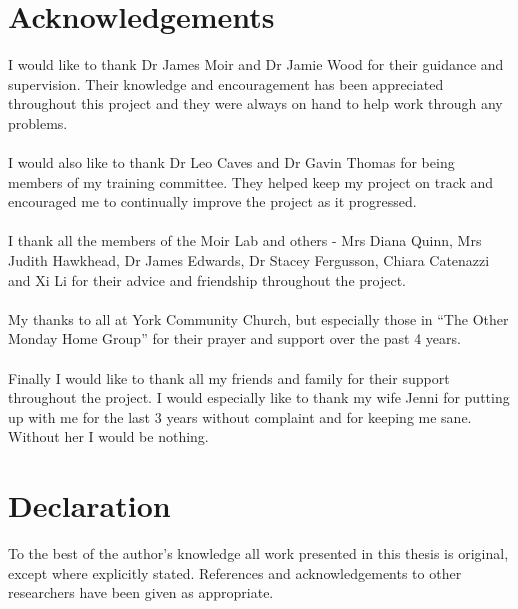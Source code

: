 \documentclass[a4paper,oneside,openright,12pt]{book}
\begin{document}
\chapter*{Acknowledgements}
I would like to thank Dr James Moir and Dr Jamie Wood for their guidance and supervision. Their knowledge and encouragement has been appreciated throughout this project and they were always on hand to help work through any problems.
\\\\
I would also like to thank Dr Leo Caves and Dr Gavin Thomas for being members of my training committee. They helped keep my project on track and encouraged me to continually improve the project as it progressed.
\\\\
I thank all the members of the Moir Lab and others - Mrs Diana Quinn, Mrs Judith Hawkhead, Dr James Edwards, Dr Stacey Fergusson, Chiara Catenazzi and Xi Li for their advice and friendship throughout the project.
\\\\
My thanks to all at York Community Church, but especially those in ``The Other Monday Home Group'' for their prayer and support over the past 4 years.
\\\\
Finally I would like to thank all my friends and family for their support throughout the project. I would especially like to thank my wife Jenni for putting up with me for the last 3 years without complaint and for keeping me sane. Without her I would be nothing.

\chapter*{Declaration}

To the best of the author's knowledge all work presented in this thesis is original, except where explicitly stated. References and acknowledgements to other researchers have been given as appropriate.













\backmatter

\newpage

\singlespacing

\printnomenclature[3cm]
\doublespacing

\renewcommand{\bibname}{References}
\addcontentsline{toc}{chapter}{\bibname}


\end{document}
